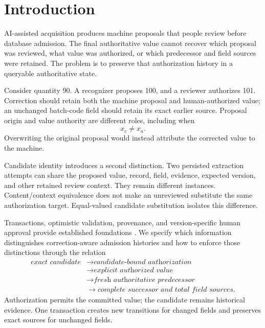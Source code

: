 \section{Introduction}
\label{sec:introduction}

AI-assisted acquisition produces machine proposals that people review before database admission. The final authoritative value cannot recover which proposal was reviewed, what value was authorized, or which predecessor and field sources were retained. The problem is to preserve that authorization history in a queryable authoritative state.

Consider quantity 90. A recognizer proposes 100, and a reviewer authorizes 101. Correction should retain both the machine proposal and human-authorized value; an unchanged batch-code field should retain its exact earlier source. Proposal origin and value authority are different roles, including when
\begin{equation}
x_c\neq x_a.
\label{eq:intro-correction}
\end{equation}
Overwriting the original proposal would instead attribute the corrected value to the machine.

Candidate identity introduces a second distinction. Two persisted extraction attempts can share the proposed value, record, field, evidence, expected version, and other retained review context. They remain different instances. Content/context equivalence does not make an unreviewed substitute the same authorization target. Equal-valued candidate substitution isolates this difference.

Transactions, optimistic validation, provenance, and version-specific human approval provide established foundations \citep{gray1981transaction,kung1981occ,moreau2013provdm,mershad2015approval}. We specify which information distinguishes correction-aware admission histories and how to enforce those distinctions through the relation
\begin{equation}
\begin{aligned}
\textit{exact candidate}
&\rightarrow\textit{candidate-bound authorization}\\
&\rightarrow\textit{explicit authorized value}\\
&\rightarrow\textit{fresh authoritative predecessor}\\
&\rightarrow\textit{complete successor and total field sources}.
\end{aligned}
\label{eq:admission-chain}
\end{equation}
Authorization permits the committed value; the candidate remains historical evidence. One transaction creates new transitions for changed fields and preserves exact sources for unchanged fields.

